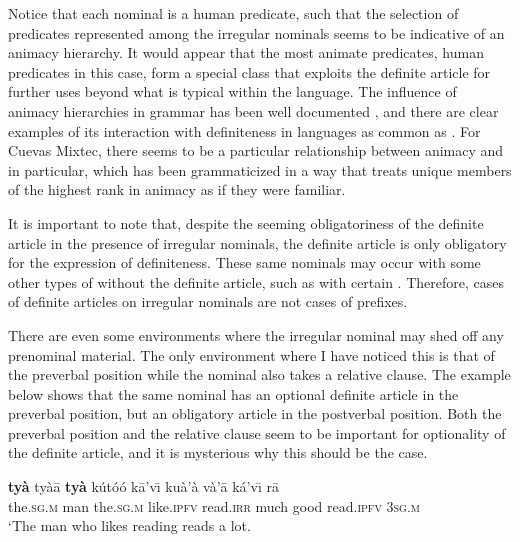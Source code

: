 \documentclass[output=paper,modfonts,nonflat]{langsci/langscibook}
\begin{document}
Notice that each nominal is a human predicate, such that the selection of predicates represented among the irregular nominals seems to be indicative of an animacy hierarchy.  It would appear that the most animate predicates, human predicates in this case, form a special class that exploits the definite article for further uses beyond what is typical within the language.  The influence of animacy hierarchies in grammar has been well documented \citep{Dahl1996}, and there are clear examples of its interaction with definiteness in languages as common as .  For Cuevas Mixtec, there seems to be a particular relationship between animacy and  in particular, which has been grammaticized in a way that treats unique members of the highest rank in animacy as if they were familiar. 

It is important to note that, despite the seeming obligatoriness of the definite article in the presence of irregular nominals, the definite article is only obligatory for the expression of definiteness.  These same nominals may occur with some other types of  without the definite article, such as with certain .  Therefore, cases of definite articles on irregular nominals are not cases of prefixes.

\z 

There are even some environments where the irregular nominal may shed off any prenominal material.  The only environment where I have noticed this is that of the preverbal position while the nominal also takes a relative clause.  The example below shows that the same nominal has an optional definite article in the preverbal position, but an obligatory article in the postverbal position.  Both the preverbal position and the relative clause seem to be important for optionality of the definite article, and it is mysterious why this should be the case. 

\ea {}\label{ex:cisneros:76}
\ea
\gll
{\ob}{\op}\textbf{ty\`a}{\cp} ty\`a\=a \textbf{ty\`a} k\'ut\'o\'o k\=a'v\=\i{}{\cb} ku\`a'\`a v\`a'\=a k\'a'v\=\i{} r\=a\\
\phantom{[(}the.\textsc{sg.m} man the.\textsc{sg.m} like.\textsc{ipfv} read.\textsc{irr} much good read.\textsc{ipfv} 3\textsc{sg.m}\\
\glt
`The man who likes reading reads a lot.
\end{document}
